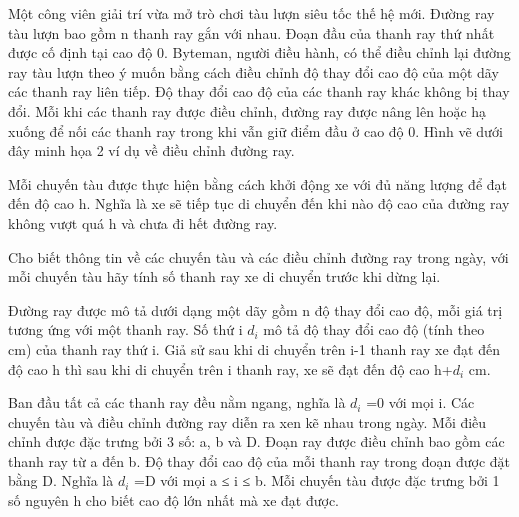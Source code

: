 Một công viên giải trí vừa mở trò chơi tàu lượn siêu tốc thế hệ mới. Đường ray tàu lượn bao gồm n thanh ray gắn với   nhau. Đoạn đầu của thanh ray thứ nhất được cố định tại cao độ 0. Byteman, người điều hành, có thể điều chỉnh lại đường   ray tàu lượn theo ý muốn bằng cách điều chỉnh       độ thay đổi cao độ      của một dãy các thanh ray liên tiếp. Độ thay   đổi cao độ của các thanh ray khác không bị thay đổi. Mỗi khi các thanh ray được điều chỉnh, đường ray được nâng lên   hoặc hạ xuống để nối các thanh ray trong khi vẫn giữ điểm đầu ở cao độ 0. Hình vẽ dưới đây minh họa 2 ví dụ về điều  chỉnh đường ray.  

   Mỗi chuyến tàu được thực hiện bằng cách khởi động xe với đủ năng lượng để đạt đến độ cao h. Nghĩa là xe sẽ tiếp tục   di chuyển đến khi nào độ cao của đường ray không vượt quá h và chưa đi hết đường ray.  

   Cho biết thông tin về các chuyến tàu và các điều chỉnh đường ray trong ngày, với mỗi chuyến tàu hãy tính số thanh ray   xe di chuyển trước khi dừng lại.  

   Đường ray được mô tả dưới dạng một dãy gồm n độ thay đổi cao độ, mỗi giá trị tương ứng với một thanh ray. Số thứ i   $d_{i}$   mô tả độ thay đổi cao độ (tính theo cm) của thanh ray thứ i. Giả sử sau khi di chuyển trên i-1 thanh ray xe   đạt đến độ cao h thì sau khi di chuyển trên i thanh ray, xe sẽ đạt đến độ cao h+$d_{i}$   cm.  

   Ban đầu tất cả các thanh ray đều nằm ngang, nghĩa là $d_{i}$   =0 với mọi i. Các chuyến tàu và điều chỉnh đường   ray diễn ra xen kẽ nhau trong ngày. Mỗi điều chỉnh được đặc trưng bởi 3 số: a, b và D. Đoạn ray được điều chỉnh bao gồm   các thanh ray từ a đến b. Độ thay đổi cao độ của mỗi thanh ray trong đoạn được đặt bằng D. Nghĩa là $d_{i}$   =D   với mọi a ≤ i ≤ b. Mỗi chuyến tàu được đặc trưng bởi 1 số nguyên h cho biết cao độ lớn nhất mà xe đạt được.